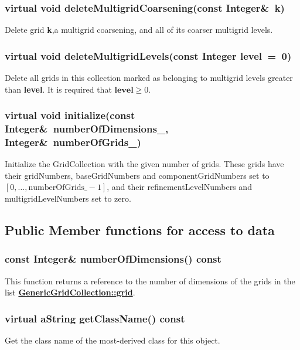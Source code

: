 \documentclass{article}
\begin{document}
  \subsubsection{virtual void deleteMultigridCoarsening(const Integer\&~k)}
  \label{GridCollection::deleteMultigridCoarsening(k)}
    Delete grid \textbf{k},a multigrid coarsening, and all of its coarser multigrid levels.

  \subsubsection{virtual void deleteMultigridLevels(const Integer level~=~0)}
  \label{GridCollection::deleteMultigridLevels(level)}
    Delete all grids in this collection marked as belonging to multigrid levels greater than \textbf{level}.
    It is required that $\textbf{level}\ge0$.

  \subsubsection{virtual void initialize(const Integer\&~numberOfDimensions\_,  Integer\&~numberOfGrids\_)}
  \label{GridCollection::initialize(numberOfDimensions,numberOfGrids_)}
    Initialize the GridCollection with the given number of grids.
    These grids have their gridNumbers, baseGridNumbers and componentGridNumbers
    set to $[0,\dots,\mbox{numberOfGrids\_}-1]$, and their refinementLevelNumbers and
    multigridLevelNumbers set to zero.

\subsection{Public Member functions for access to data}
\label{GridCollection::PublicAccessToData}

  \subsubsection{const Integer\& numberOfDimensions() const}
  \label{GenericGridCollection::numberOfDimensions() const}
    This function returns a reference to the number of dimensions of the grids in the list
    {\bf{}\hyperref{grid}{grid \rm(\S}{)}{GenericGridCollection::grid}}.

  \subsubsection{virtual aString getClassName() const}
  \label{GridCollection::getClassName() const}
    Get the class name of the most-derived class for this object.
\end{document}
